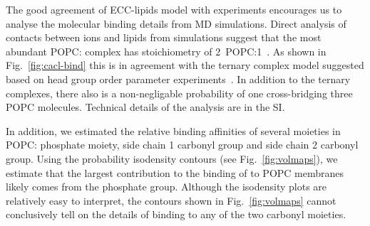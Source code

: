 \documentclass[aip,jcp,twocolumn]{revtex4}
\begin{document}
The good agreement of ECC-lipids model with experiments encourages us to analyse the
molecular binding details from MD simulations. Direct analysis of contacts between ions and
lipids from simulations suggest that the most abundant POPC: complex 
has stoichiometry of 2~POPC:1~.
As shown in Fig.~\ref{fig:cacl-bind} this is in agreement
with the ternary complex model suggested based on head group order parameter
experiments~\cite{altenbach84}.
In addition to the ternary complexes, there also is a non-negligable probability
of one  cross-bridging three POPC molecules.
Technical details of the analysis are in the SI. 

In addition, we estimated the relative binding affinities of several moieties in POPC:
phosphate moiety, side chain 1 carbonyl group and side chain 2 carbonyl group.
Using the probability isodensity contours (see Fig.~\ref{fig:volmaps}), 
we estimate that the largest contribution
to the binding of  to POPC membranes likely comes from the phosphate group. 
Although the isodensity plots are relatively easy to interpret,
the contours shown in Fig.~\ref{fig:volmaps} cannot conclusively tell on the details
of  binding to any of the two carbonyl moieties. 
\end{document}
